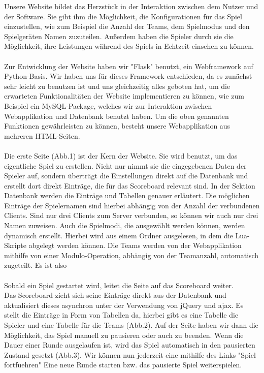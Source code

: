 Unsere Website bildet das Herzstück in der Interaktion zwischen dem Nutzer und der Software. Sie gibt ihm die Möglichkeit, die Konfigurationen für das Spiel einzustellen, wie zum Beispiel die Anzahl der Teams, dem Spielmodus und den Spielgeräten Namen zuzuteilen. Außerdem haben die Spieler durch sie die Möglichkeit, ihre Leistungen während des Spiels in Echtzeit einsehen zu können.\\\\
Zur Entwicklung der Website haben wir "Flask" benutzt, ein Webframework auf Python-Basis. Wir haben uns für dieses Framework entschieden, da es zunächst sehr leicht zu benutzen ist und uns gleichzeitig alles geboten hat, um die erwarteten Funktionalitäten der Website implementieren zu können, wie zum Beispiel ein MySQL-Package, welches wir zur Interaktion zwischen Webapplikation und Datenbank benutzt haben.
Um die oben genannten Funktionen gewährleisten zu können, besteht unsere Webapplikation aus mehreren HTML-Seiten.\\\\
Die erste Seite (Abb.1) ist der Kern der Website. Sie wird benutzt, um das eigentliche Spiel zu erstellen. Nicht nur nimmt sie die eingegebenen Daten der Spieler auf, sondern überträgt die Einstellungen direkt auf die Datenbank und erstellt dort direkt Einträge, die für das Scoreboard relevant sind. In der Sektion Datenbank werden die Einträge und Tabellen genauer erläutert. Die möglichen Einträge der Spielernamen sind hierbei abhängig von der Anzahl der verbundenen Clients. Sind nur drei Clients zum Server verbunden, so können wir auch nur drei Namen zuweisen.
Auch die Spielmodi, die ausgewählt werden können, werden dynamisch erstellt. Hierbei wird aus einem Ordner ausgelesen, in dem die Lua-Skripte abgelegt werden können. Die Teams werden von der Webapplikation mithilfe von einer Modulo-Operation, abhängig von der Teamanzahl, automatisch zugeteilt. Es ist also \\\\
Sobald ein Spiel gestartet wird, leitet die Seite auf das Scoreboard weiter.\\ Das Scoreboard zieht sich seine Einträge direkt aus der Datenbank und aktualisiert dieses asynchron unter der Verwendung von jQuery und ajax. Es stellt die Einträge in Form von Tabellen da, hierbei gibt es eine Tabelle die Spieler und eine Tabelle für die Teams (Abb.2). Auf der Seite haben wir dann die Möglichkeit, das Spiel manuell zu pausieren oder auch zu beenden. Wenn die Dauer einer Runde ausgelaufen ist, wird das Spiel automatisch in den pausierten Zustand gesetzt (Abb.3). Wir können nun jederzeit eine mithilfe des Links "Spiel fortfuehren" Eine neue Runde starten bzw. das pausierte Spiel weiterspielen.\\
